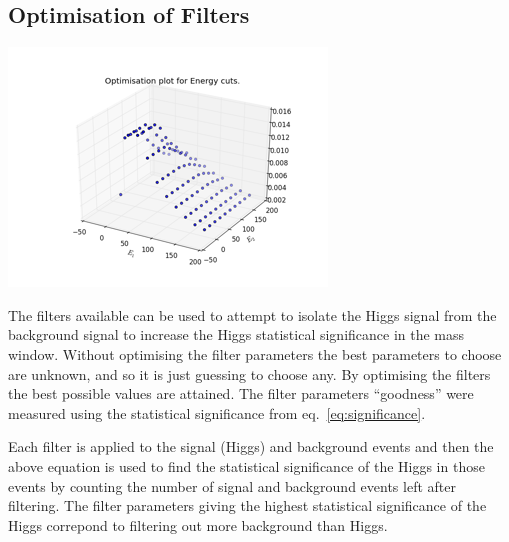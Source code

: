 \documentclass[11pt]{amsart}
\newenvironment{Figure}
  {\par\medskip\noindent\minipage{\linewidth}}
  {\endminipage\par\medskip}
\begin{document}
\begin{multicols}{2}
\section{Optimisation of Filters}
\label{sec:optimisation}

\begin{Figure}
  \centering
  \includegraphics[width=\linewidth]{energy}
  \label{fig:energy}
\end{Figure}

The filters available can be used to attempt to isolate the Higgs signal from the background signal to increase the Higgs statistical significance in the mass window. Without optimising the filter parameters the best parameters to choose are unknown, and so it is just guessing to choose any. By optimising the filters the best possible values are attained. The filter parameters ``goodness'' were measured using the statistical significance from eq.~\ref{eq:significance}.

Each filter is applied to the signal (Higgs) and background events and then the above equation is used to find the statistical significance of the Higgs in those events by counting the number of signal and background events left after filtering. The filter parameters giving the highest statistical significance of the Higgs correpond to filtering out more background than Higgs.


\end{multicols}
\end{document}
